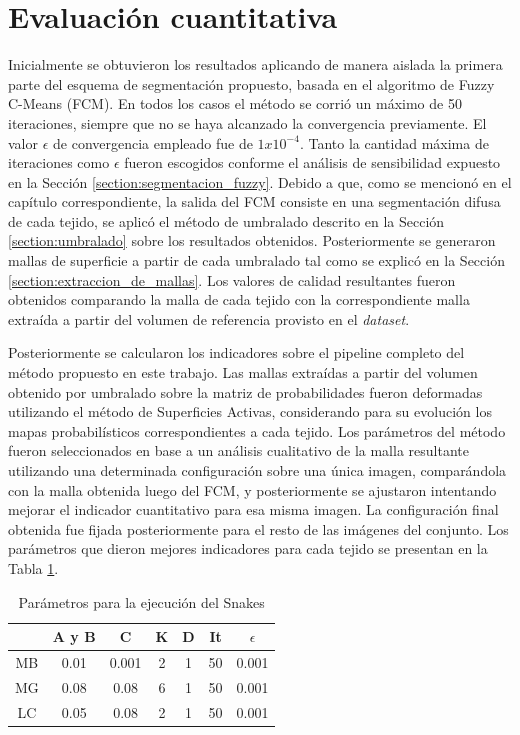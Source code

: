 \section{Evaluación cuantitativa}\label{section:evaluacion_cuantitativa}
Inicialmente se obtuvieron los resultados aplicando de manera aislada la primera parte del esquema de segmentación propuesto, basada en el algoritmo de Fuzzy C-Means (FCM). En todos los casos el método se corrió un máximo de 50 iteraciones, siempre que no se haya alcanzado la convergencia previamente. El valor $\epsilon$ de convergencia empleado fue de $1x10^{-4}$. Tanto la cantidad máxima de iteraciones como $\epsilon$ fueron escogidos conforme el análisis de sensibilidad expuesto en la Sección \ref{section:segmentacion_fuzzy}. Debido a que, como se mencionó en el capítulo correspondiente, la salida del FCM consiste en una segmentación difusa de cada tejido, se aplicó  el método de umbralado descrito en la Sección \ref{section:umbralado} sobre los resultados obtenidos. Posteriormente se generaron mallas de superficie a partir de cada umbralado tal como se explicó en la Sección \ref{section:extraccion_de_mallas}. Los valores de calidad resultantes fueron obtenidos comparando la malla de cada tejido con la correspondiente malla extraída a partir del volumen de referencia provisto en el \emph{dataset}.

Posteriormente se calcularon los indicadores sobre el pipeline completo del método propuesto en este trabajo. Las mallas extraídas a partir del volumen obtenido por umbralado sobre la matriz de probabilidades fueron deformadas utilizando el método de Superficies Activas, considerando para su evolución los mapas probabilísticos correspondientes a cada tejido. Los parámetros del método fueron seleccionados en base a un análisis cualitativo de la malla resultante utilizando una determinada configuración sobre una única imagen, comparándola con la malla obtenida luego del FCM, y posteriormente se ajustaron intentando mejorar el indicador cuantitativo para esa misma imagen. La configuración final obtenida fue fijada posteriormente para el resto de las imágenes del conjunto. Los parámetros que dieron mejores indicadores para cada tejido se presentan en la Tabla \ref{table:parametros_snakes}.

\begin{table}[h]
	\centering
	\begin{tabular}{c|cccccc}
		\multicolumn{1}{l|}{} & A y B & C & K & D & It & $\epsilon$ \\ \hline
		MB & 0.01 & 0.001 & 2 & 1 & 50 & 0.001 \\
		MG & 0.08 & 0.08 & 6 & 1 & 50 & 0.001 \\
		LC & 0.05 & 0.08 & 2 & 1 & 50 & 0.001
	\end{tabular}
	\caption{Parámetros para la ejecución del Snakes}
	\label{table:parametros_snakes}
\end{table}

